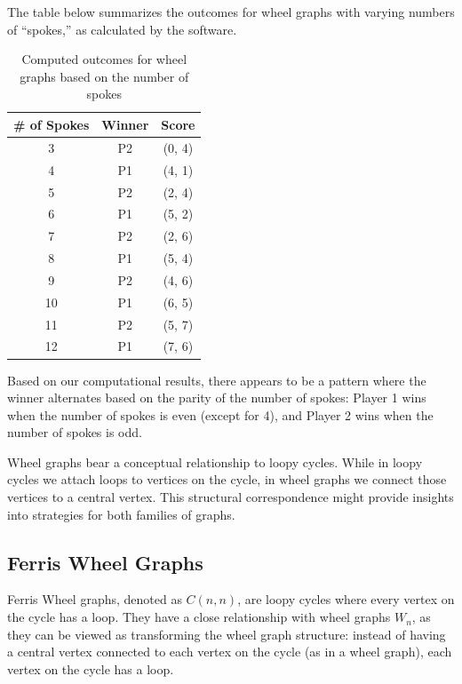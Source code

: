 \documentclass{article}
\begin{document}
The table below summarizes the outcomes for wheel graphs with varying numbers of ``spokes,'' as calculated by the software. 

\begin{table}[hbt!]
\centering
\begin{tabular}{|c|c|c|}
\hline
\textbf{\# of Spokes} & \textbf{Winner} & \textbf{Score} \\
\hline
3 & P2 & (0, 4) \\
4 & P1 & (4, 1) \\
5 & P2 & (2, 4) \\
6 & P1 & (5, 2) \\
7 & P2 & (2, 6) \\
8 & P1 & (5, 4) \\
9 & P2 & (4, 6) \\
10 & P1 & (6, 5) \\
11 & P2 & (5, 7) \\
12 & P1 & (7, 6) \\
\hline
\end{tabular}
\caption{Computed outcomes for wheel graphs based on the number of spokes}
\label{table:wheel-graph-outcomes}
\end{table}
\FloatBarrier 

Based on our computational results, there appears to be a pattern where the winner alternates based on the parity of the number of spokes: Player 1 wins when the number of spokes is even (except for 4), and Player 2 wins when the number of spokes is odd.

Wheel graphs bear a conceptual relationship to loopy cycles. While in loopy cycles we attach loops to vertices on the cycle, in wheel graphs we connect those vertices to a central vertex. This structural correspondence might provide insights into strategies for both families of graphs.

\subsection{Ferris Wheel Graphs}

Ferris Wheel graphs, denoted as $C(n,n)$, are loopy cycles where every vertex on the cycle has a loop. They have a close relationship with wheel graphs $W_n$, as they can be viewed as transforming the wheel graph structure: instead of having a central vertex connected to each vertex on the cycle (as in a wheel graph), each vertex on the cycle has a loop.
\end{document}
